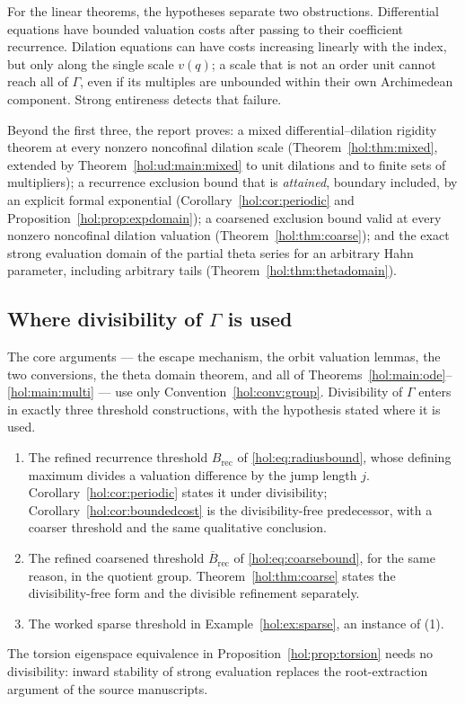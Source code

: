 \documentclass[11pt]{article}
\numberwithin{equation}{section}
\theoremstyle{definition}
\theoremstyle{remark}
\begin{document}
For the linear theorems, the hypotheses separate two obstructions.
Differential equations have bounded valuation costs after passing to their
coefficient recurrence. Dilation
equations can have costs increasing linearly with the index, but only along
the single scale $v(q)$; a scale that is not an order unit cannot reach all of
$\Gamma$, even if its multiples are unbounded within their own Archimedean
component. Strong entireness detects that failure.

Beyond the first three, the report proves: a mixed differential--dilation rigidity
theorem at every nonzero noncofinal dilation scale
(Theorem~\ref{hol:thm:mixed}, extended by Theorem~\ref{hol:ud:main:mixed} to
unit dilations and to finite sets of multipliers); a recurrence exclusion bound that is
\emph{attained}, boundary included, by an explicit formal exponential
(Corollary~\ref{hol:cor:periodic} and
Proposition~\ref{hol:prop:expdomain}); a coarsened exclusion bound valid at
every nonzero noncofinal dilation valuation (Theorem~\ref{hol:thm:coarse}); and the exact
strong evaluation domain of the partial theta series for an arbitrary Hahn
parameter, including arbitrary tails (Theorem~\ref{hol:thm:thetadomain}).

\subsection{Where divisibility of \texorpdfstring{$\Gamma$}{Gamma} is used}
\label{hol:sub:divisibility}

The core arguments --- the escape mechanism, the orbit valuation lemmas, the
two conversions, the theta domain theorem, and all of
Theorems~\ref{hol:main:ode}--\ref{hol:main:multi} --- use only
Convention~\ref{hol:conv:group}. Divisibility of $\Gamma$ enters in exactly
three threshold constructions, with the hypothesis stated where it is used.
\begin{enumerate}[label=\textup{(\arabic*)}]
\item The refined recurrence threshold $B_{\mathrm{rec}}$ of
\eqref{hol:eq:radiusbound}, whose defining maximum divides a valuation
difference by the jump length $j$. Corollary~\ref{hol:cor:periodic} states it
under divisibility; Corollary~\ref{hol:cor:boundedcost} is the
divisibility-free predecessor, with a coarser threshold and the same
qualitative conclusion.
\item The refined coarsened threshold $\overline B_{\mathrm{rec}}$ of
\eqref{hol:eq:coarsebound}, for the same reason, in the quotient group.
Theorem~\ref{hol:thm:coarse} states the divisibility-free form and the
divisible refinement separately.
\item The worked sparse threshold in Example~\ref{hol:ex:sparse}, an instance
of (1).
\end{enumerate}
The torsion eigenspace equivalence in Proposition~\ref{hol:prop:torsion}
needs no divisibility: inward stability of strong evaluation replaces the
root-extraction argument of the source manuscripts.
\end{document}
